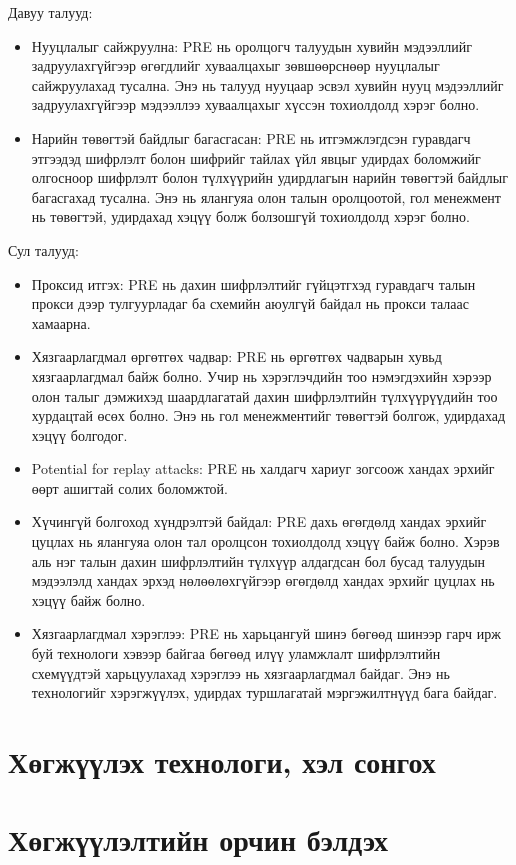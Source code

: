 Давуу талууд:
\begin{itemize}
    \item Нууцлалыг сайжруулна: PRE нь оролцогч талуудын хувийн мэдээллийг задруулахгүйгээр өгөгдлийг хуваалцахыг зөвшөөрснөөр нууцлалыг сайжруулахад тусална. Энэ нь талууд нууцаар эсвэл хувийн нууц мэдээллийг задруулахгүйгээр мэдээллээ хуваалцахыг хүссэн тохиолдолд хэрэг болно.
    \item Нарийн төвөгтэй байдлыг багасгасан: PRE нь итгэмжлэгдсэн гуравдагч этгээдэд шифрлэлт болон шифрийг тайлах үйл явцыг удирдах боломжийг олгосноор шифрлэлт болон түлхүүрийн удирдлагын нарийн төвөгтэй байдлыг багасгахад тусална. Энэ нь ялангуяа олон талын оролцоотой, гол менежмент нь төвөгтэй, удирдахад хэцүү болж болзошгүй тохиолдолд хэрэг болно.
\end{itemize}

Сул талууд:
\begin{itemize}
    \item Проксид итгэх: PRE нь дахин шифрлэлтийг гүйцэтгхэд гуравдагч талын прокси дээр тулгуурладаг ба схемийн аюулгүй байдал нь прокси талаас хамаарна.
    \item Хязгаарлагдмал өргөтгөх чадвар: PRE нь өргөтгөх чадварын хувьд хязгаарлагдмал байж болно. Учир нь хэрэглэчдийн тоо нэмэгдэхийн хэрээр олон талыг дэмжихэд шаардлагатай дахин шифрлэлтийн түлхүүрүүдийн тоо хурдацтай өсөх болно. Энэ нь гол менежментийг төвөгтэй болгож, удирдахад хэцүү болгодог.
    \item Potential for replay attacks: PRE нь халдагч хариуг зогсоож хандах эрхийг өөрт ашигтай солих боломжтой. 
    \item Хүчингүй болгоход хүндрэлтэй байдал: PRE дахь өгөгдөлд хандах эрхийг цуцлах нь ялангуяа олон тал оролцсон тохиолдолд хэцүү байж болно. Хэрэв аль нэг талын дахин шифрлэлтийн түлхүүр алдагдсан бол бусад талуудын мэдээлэлд хандах эрхэд нөлөөлөхгүйгээр өгөгдөлд хандах эрхийг цуцлах нь хэцүү байж болно.
    \item Хязгаарлагдмал хэрэглээ: PRE нь харьцангуй шинэ бөгөөд шинээр гарч ирж буй технологи хэвээр байгаа бөгөөд илүү уламжлалт шифрлэлтийн схемүүдтэй харьцуулахад хэрэглээ нь хязгаарлагдмал байдаг. Энэ нь технологийг хэрэгжүүлэх, удирдах туршлагатай мэргэжилтнүүд бага байдаг.
\end{itemize}

\section{Хөгжүүлэх технологи, хэл сонгох}
\section{Хөгжүүлэлтийн орчин бэлдэх}